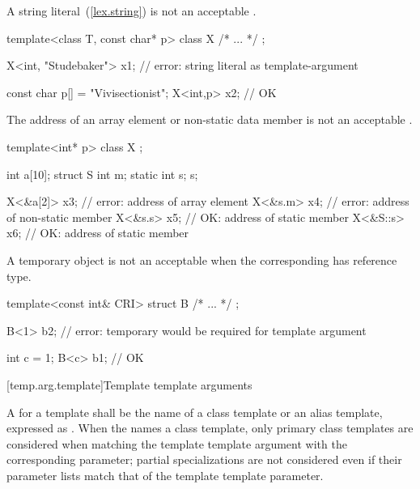 \pnum
\enternote
A string literal~(\ref{lex.string})
is not an acceptable
.
\enterexample

\begin{codeblock}
template<class T, const char* p> class X {
  /* ... */
};

X<int, "Studebaker"> x1;        // error: string literal as template-argument

const char p[] = "Vivisectionist";
X<int,p> x2;                    // OK
\end{codeblock}
\exitexample
\exitnote

\pnum
\enternote
The address of an array element or non-static data member is not an acceptable
.
\enterexample

\begin{codeblock}
template<int* p> class X { };

int a[10];
struct S { int m; static int s; } s;

X<&a[2]> x3;                    // error: address of array element
X<&s.m> x4;                     // error: address of non-static member
X<&s.s> x5;                     // OK: address of static member
X<&S::s> x6;                    // OK: address of static member
\end{codeblock}
\exitexample
\exitnote

\pnum
\enternote
A temporary object
is not an acceptable
when the corresponding
has reference type.
\enterexample

\begin{codeblock}
template<const int& CRI> struct B { /* ... */ };

B<1> b2;                        // error: temporary would be required for template argument

int c = 1;
B<c> b1;                        // OK
\end{codeblock}
\exitexample
\exitnote

[temp.arg.template]{Template template arguments}

\pnum
A
for a template
shall be the name of a class template or an alias template, expressed as
.
When the  names a class
template, only primary class templates are considered when matching the template template
argument with the corresponding parameter; partial specializations are not
considered even if their parameter lists match that of the template template
parameter.

